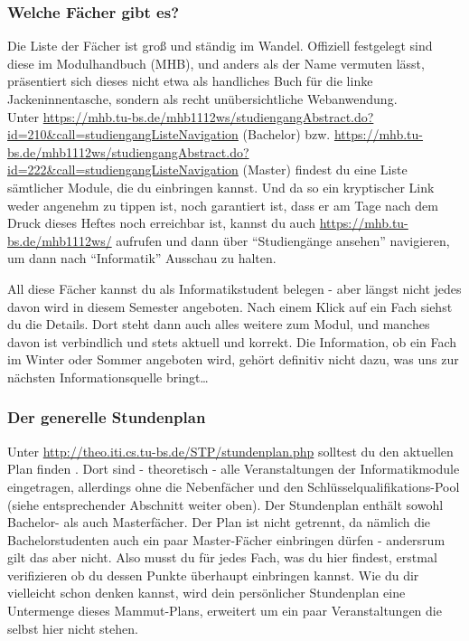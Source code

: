 \subsubsection{Welche Fächer gibt es?}
Die Liste der Fächer ist groß und ständig im Wandel. Offiziell
festgelegt sind diese im Modulhandbuch (MHB), und anders als der Name
vermuten lässt, präsentiert sich dieses nicht etwa als handliches Buch
für die linke Jackeninnentasche, sondern als recht unübersichtliche
Webanwendung. \\ Unter
\url{https://mhb.tu-bs.de/mhb1112ws/studiengangAbstract.do?id=210&call=studiengangListeNavigation}
(Bachelor) bzw. \url{https://mhb.tu-bs.de/mhb1112ws/studiengangAbstract.do?id=222&call=studiengangListeNavigation}
(Master)
findest du eine Liste sämtlicher Module, die du  einbringen kannst. Und da so ein kryptischer Link weder angenehm zu tippen ist, noch garantiert ist, dass er am Tage nach dem Druck dieses Heftes noch erreichbar ist, kannst du auch \url{https://mhb.tu-bs.de/mhb1112ws/} aufrufen und dann über "`Studiengänge ansehen"' navigieren, um dann nach "`Informatik"' Ausschau zu halten.

All diese Fächer kannst du als Informatikstudent belegen - aber längst nicht jedes davon wird in diesem Semester angeboten. Nach einem Klick auf ein Fach siehst du die Details. Dort steht dann auch alles weitere zum Modul, und manches davon ist verbindlich und stets aktuell und korrekt. Die Information, ob ein Fach im Winter oder Sommer angeboten wird, gehört definitiv nicht dazu, was uns zur nächsten Informationsquelle bringt\ldots

\subsubsection{Der generelle Stundenplan}
Unter %
\url{http://theo.iti.cs.tu-bs.de/STP/stundenplan.php}
solltest du den aktuellen Plan  finden .%
Dort sind -
theoretisch - alle Veranstaltungen der Informatikmodule eingetragen,
allerdings ohne die Nebenfächer und den Schlüsselqualifikations-Pool (siehe entsprechender Abschnitt weiter oben). Der Stundenplan enthält sowohl Bachelor- als auch Masterfächer. Der Plan ist nicht getrennt, da nämlich die Bachelorstudenten auch ein paar Master-Fächer einbringen dürfen - andersrum gilt das aber nicht. Also musst du für jedes Fach, was du hier findest, erstmal verifizieren ob du dessen Punkte überhaupt  einbringen kannst. Wie du dir vielleicht schon denken kannst, wird dein persönlicher Stundenplan eine Untermenge dieses Mammut-Plans, erweitert um ein paar Veranstaltungen die selbst hier nicht stehen.

